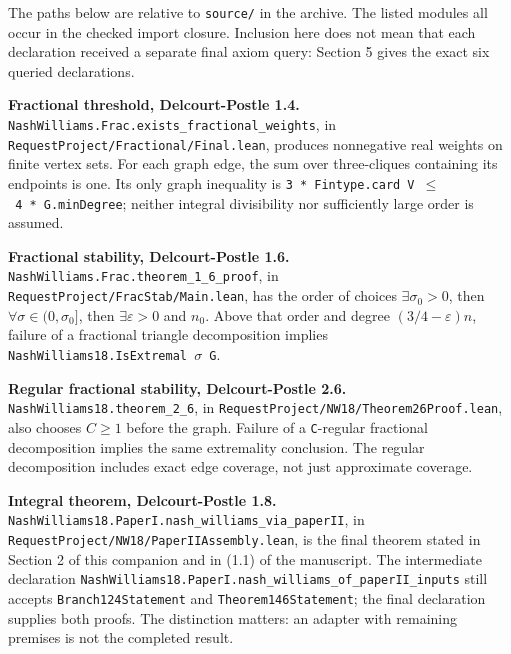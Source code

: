 \documentclass[english,11pt,a4paper]{article}
\begin{document}
The paths below are relative to \texttt{source/\allowbreak{}} in the archive. The listed modules all occur in the checked import closure. Inclusion here does not mean that each declaration received a separate final axiom query: Section 5 gives the exact six queried declarations.

\textbf{Fractional threshold, Delcourt-Postle 1.4.} \texttt{Nash\allowbreak{}Williams.\allowbreak{}Frac.\allowbreak{}exists\_\allowbreak{}fractional\_\allowbreak{}weights}, in \texttt{Request\allowbreak{}Project/\allowbreak{}Fractional/\allowbreak{}Final.\allowbreak{}lean}, produces nonnegative real weights on finite vertex sets. For each graph edge, the sum over three-cliques containing its endpoints is one. Its only graph inequality is \texttt{3\ *\ Fintype.\allowbreak{}card\ V\ \ensuremath{\le}\ 4\ *\ G.\allowbreak{}min\allowbreak{}Degree}; neither integral divisibility nor sufficiently large order is assumed.

\textbf{Fractional stability, Delcourt-Postle 1.6.} \texttt{Nash\allowbreak{}Williams.\allowbreak{}Frac.\allowbreak{}theorem\_\allowbreak{}1\_\allowbreak{}6\_\allowbreak{}proof}, in \texttt{Request\allowbreak{}Project/\allowbreak{}Frac\allowbreak{}Stab/\allowbreak{}Main.\allowbreak{}lean}, has the order of choices \(\exists\sigma_0>0\), then \(\forall\sigma\in(0,\sigma_0]\), then \(\exists\varepsilon>0\) and \(n_0\). Above that order and degree \((3/4-\varepsilon)n\), failure of a fractional triangle decomposition implies \texttt{Nash\allowbreak{}Williams18.\allowbreak{}Is\allowbreak{}Extremal\ \ensuremath{\sigma}\ G}.

\textbf{Regular fractional stability, Delcourt-Postle 2.6.} \texttt{Nash\allowbreak{}Williams18.\allowbreak{}theorem\_\allowbreak{}2\_\allowbreak{}6}, in \texttt{Request\allowbreak{}Project/\allowbreak{}NW18/\allowbreak{}Theorem26Proof.\allowbreak{}lean}, also chooses \(C\ge1\) before the graph. Failure of a \texttt{C}-regular fractional decomposition implies the same extremality conclusion. The regular decomposition includes exact edge coverage, not just approximate coverage.

\textbf{Integral theorem, Delcourt-Postle 1.8.} \texttt{Nash\allowbreak{}Williams18.\allowbreak{}Paper\allowbreak{}I.\allowbreak{}nash\_\allowbreak{}williams\_\allowbreak{}via\_\allowbreak{}paper\allowbreak{}II}, in \texttt{Request\allowbreak{}Project/\allowbreak{}NW18/\allowbreak{}Paper\allowbreak{}IIAssembly.\allowbreak{}lean}, is the final theorem stated in Section 2 of this companion and in (1.1) of the manuscript. The intermediate declaration \texttt{Nash\allowbreak{}Williams18.\allowbreak{}Paper\allowbreak{}I.\allowbreak{}nash\_\allowbreak{}williams\_\allowbreak{}of\_\allowbreak{}paper\allowbreak{}II\_\allowbreak{}inputs} still accepts \texttt{Branch124Statement} and \texttt{Theorem146Statement}; the final declaration supplies both proofs. The distinction matters: an adapter with remaining premises is not the completed result.
\end{document}
